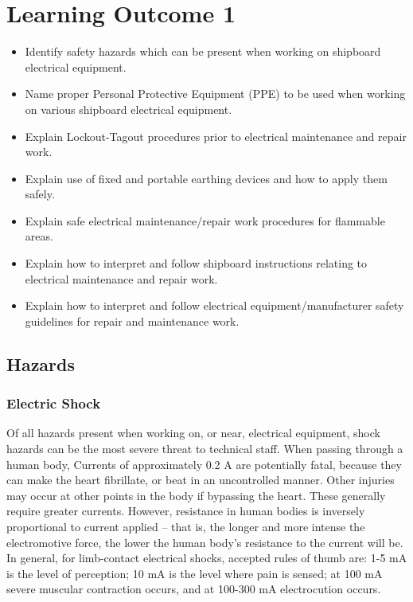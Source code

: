 \documentclass[11pt,a4paper]{article}
\begin{document}
\section{Learning Outcome 1}
\begin{tcolorbox}[colback=red!5!white,colframe=red!75!black,title=\textbf{Demonstrate knowledge of safety precautions to take prior to undertaking shipboard electrical maintenance and repair work}]
\begin{itemize}
\item Identify safety hazards which can be present when working on shipboard electrical equipment.
\item Name proper Personal Protective Equipment (PPE) to be used when working on various shipboard electrical equipment.
\item Explain Lockout-Tagout procedures prior to electrical maintenance and repair work.
\item Explain use of fixed and portable earthing devices and how to apply them safely.
\item Explain safe electrical maintenance/repair work procedures for flammable areas.
\item Explain how to interpret and follow shipboard instructions relating to electrical maintenance and repair work.
\item Explain how to interpret and follow electrical equipment/manufacturer safety guidelines for repair and maintenance work.
\end{itemize}
\end{tcolorbox}
\subsection{Hazards}
\subsubsection{Electric Shock}
Of all hazards present when working on, or near, electrical equipment, shock hazards can be the most severe threat to technical staff. When passing through a human body, Currents of approximately 0.2 A are potentially fatal, because they can make the heart fibrillate, or beat in an uncontrolled manner. Other injuries may occur at other points in the body if bypassing the heart. These generally require greater currents. However, resistance in human bodies is inversely proportional to current applied -- that is, the longer and more intense the electromotive force, the lower the human body's resistance to the current will be.\cite{cutnell} In general, for limb-contact electrical shocks, accepted rules of thumb are: 1-5 mA is the level of perception; 10 mA is the level where pain is sensed; at 100 mA severe muscular contraction occurs, and at 100-300 mA electrocution occurs.\cite{carr}
\end{document}
